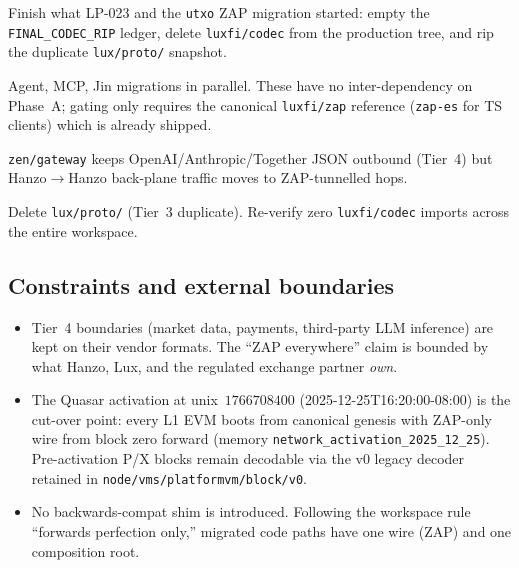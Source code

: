 \begin{description}[leftmargin=0pt,style=nextline]
  \item[Phase~A~--- consensus completion.] Finish what LP-023 and the
    \texttt{utxo} ZAP migration started: empty the
    \texttt{FINAL\_CODEC\_RIP} ledger, delete \texttt{luxfi/codec} from
    the production tree, and rip the duplicate \texttt{lux/proto/}
    snapshot.
  \item[Phase~B~--- AI/ML hot wire.] Agent, MCP, Jin migrations in
    parallel. These have no inter-dependency on Phase~A; gating only
    requires the canonical \texttt{luxfi/zap} reference
    (\texttt{zap-es} for TS clients) which is already shipped.
  \item[Phase~C~--- gateway internal tunnels.] \texttt{zen/gateway}
    keeps OpenAI/Anthropic/Together JSON outbound (Tier~4) but
    Hanzo$\to$Hanzo back-plane traffic moves to ZAP-tunnelled hops.
  \item[Phase~D~--- legacy cleanup.] Delete \texttt{lux/proto/} (Tier~3
    duplicate). Re-verify zero \texttt{luxfi/codec} imports across the
    entire workspace.
\end{description}

\subsection{Constraints and external boundaries}

\begin{itemize}[leftmargin=*]
  \item Tier~4 boundaries (market data, payments, third-party LLM
    inference) are kept on their vendor formats. The ``ZAP everywhere''
    claim is bounded by what Hanzo, Lux, and the regulated exchange partner \emph{own}.
  \item The Quasar activation at unix~$1766708400$
    (2025-12-25T16:20:00-08:00) is the cut-over point: every L1 EVM
    boots from canonical genesis with ZAP-only wire from block zero
    forward (memory \texttt{network\_activation\_2025\_12\_25}).
    Pre-activation P/X blocks remain decodable via the v0 legacy
    decoder retained in \texttt{node/vms/platformvm/block/v0}.
  \item No backwards-compat shim is introduced. Following the
    workspace rule ``forwards perfection only,'' migrated code paths
    have one wire (ZAP) and one composition root.
\end{itemize}
